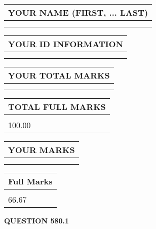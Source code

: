 \documentclass{ctexart}
\begin{document}
   
   
   
\newpage 
\setcounter{page}{ 
   580001 } 
   
   
   
   
\noindent\begin{tabular}{|l|}
\hline
YOUR NAME (FIRST, ... LAST)  \\
\hline
 \\ 
 \\ 
\hline
\end{tabular}
\hspace{0.05in} \begin{tabular}{|l|}
\hline
 YOUR   ID   INFORMATION  \\
\hline
 \\ 
 \\ 
\hline
\end{tabular}
   
   
\vspace{0.2in}\noindent\begin{tabular}{|l|}
\hline
YOUR TOTAL MARKS  \\
\hline
 \\ 
 \\ 
\hline
\end{tabular}
\hspace{0.05in} \begin{tabular}{|l|}
\hline
TOTAL FULL MARKS  \\
\hline
 \\ 
100.00 \\
\hline
\end{tabular}
   
   
 \vspace{0.2in}
 
 
 
 
   
   
  
\vspace{0.2in}
  
\noindent\begin{tabular}{|l|}
\hline
 YOUR MARKS  \\
\hline
 \\ 
 \\ 
\hline
\end{tabular}
\hspace{0.05in} \begin{tabular}{|l|}
\hline
 Full Marks  \\
\hline
 \\ 
66.67 \\
\hline
\end{tabular}
{\textbf{\Large{QUESTION
580.1 
}}}
  
\end{document}
